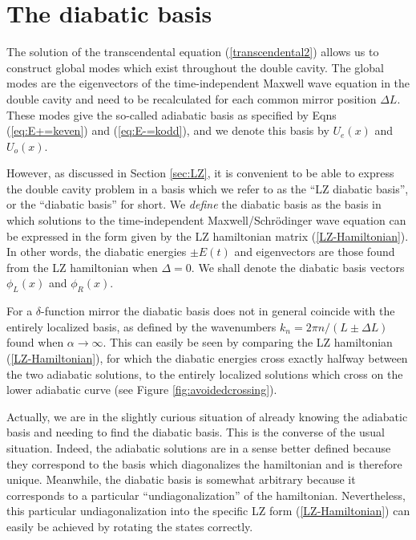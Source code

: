 \documentclass[twocolumn,english,pra,aps,superscriptaddress,floatfix]{revtex4-1}
\begin{document}
\section{The diabatic basis}
\label{sec:appendix3}


The solution of the transcendental equation (\ref{transcendental2}) allows us to construct global modes which exist throughout the double cavity. The global modes are the eigenvectors of the time-independent Maxwell wave equation in the double cavity and need to be recalculated for each common mirror position $\Delta L$. These modes give the so-called adiabatic basis as specified by Eqns (\ref{eq:E+=keven}) and (\ref{eq:E-=kodd}), and we denote this basis by $U_{e}(x)$ and $U_{o}(x)$.

However, as discussed in Section \ref{sec:LZ}, it is convenient to be able to express the double cavity problem in a basis which we refer to as the ``LZ diabatic basis'', or the ``diabatic basis'' for short. We \emph{define} the diabatic basis as the basis in which solutions to the time-independent Maxwell/Schr\"{o}dinger wave equation can be expressed in the form given by the LZ hamiltonian matrix (\ref{LZ-Hamiltonian}). In other words, the diabatic energies $\pm E(t)$ and eigenvectors are those found from the LZ hamiltonian when $\Delta=0$. We shall denote the diabatic basis vectors $ \phi_{L}(x)$ and $\phi_{R}(x)$.

For a $\delta$-function mirror the diabatic basis does not in general coincide with the entirely localized basis, as defined by the wavenumbers $k_{n}= 2 \pi n /(L\pm \Delta L)$ found when $\alpha \rightarrow \infty$. This can easily be seen by comparing the LZ hamiltonian (\ref{LZ-Hamiltonian}),  for which the diabatic energies cross exactly halfway between the two adiabatic solutions, to the entirely localized solutions which cross on the lower adiabatic curve (see Figure \ref{fig:avoidedcrossing}).

Actually, we are in the slightly curious situation of already knowing the adiabatic basis and needing to find the diabatic basis. This is the converse of the usual situation. Indeed, the adiabatic solutions are in a sense better defined because they correspond to the basis which diagonalizes the hamiltonian and is therefore unique. Meanwhile, the diabatic basis is somewhat arbitrary because it corresponds to a particular ``undiagonalization'' of the hamiltonian. Nevertheless, this particular undiagonalization into the specific LZ form (\ref{LZ-Hamiltonian}) can easily be achieved by rotating the states correctly. 
\end{document}
